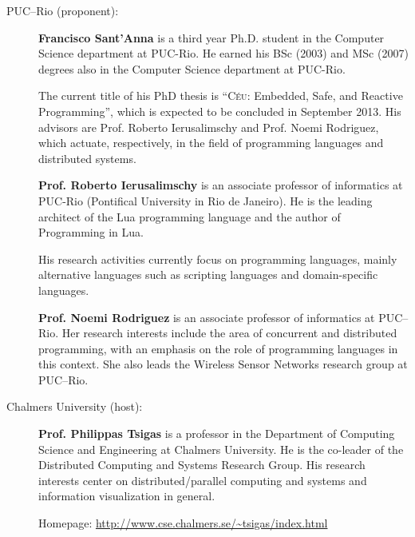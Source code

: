 \documentclass[pdftex,12pt,a4paper]{article}
\newcommand{\CEU}{\textsc{C\'{e}u}}
\begin{document}
\begin{description}

\item[PUC--Rio (proponent):]
\hspace{1mm}

\textbf{Francisco Sant'Anna} is a third year Ph.D. student in the Computer 
Science department at PUC-Rio. He earned his BSc (2003) and MSc (2007) degrees 
also in the Computer Science department at PUC-Rio.

The current title of his PhD thesis is ``\CEU{}: Embedded, Safe, and Reactive 
Programming'', which is expected to be concluded in September 2013.
His advisors are Prof. Roberto Ierusalimschy and Prof. Noemi Rodriguez, which 
actuate, respectively, in the field of programming languages and distributed 
systems.

\textbf{Prof. Roberto Ierusalimschy} is an associate professor of informatics 
at PUC-Rio (Pontifical University in Rio de Janeiro).
He is the leading architect of the Lua programming language and the author of 
Programming in Lua.\cite{lua.pil}

His research activities currently focus on programming languages, mainly 
alternative languages such as scripting languages and domain-specific 
languages.

\textbf{Prof. Noemi Rodriguez} is an associate professor of informatics at 
PUC--Rio.
Her research interests include the area of concurrent and distributed 
programming, with an emphasis on the role of programming languages in this 
context.
She also leads the Wireless Sensor Networks research group at PUC--Rio.

\item[Chalmers University (host):]
\hspace{1mm}

\textbf{Prof. Philippas Tsigas} is a professor in the Department of Computing 
Science and Engineering at Chalmers University.
He is the co-leader of the Distributed Computing and Systems Research Group.
His research interests center on distributed/parallel computing and systems and 
information visualization in general.

Homepage:
\url{http://www.cse.chalmers.se/~tsigas/index.html}

\end{description}



\end{document}
